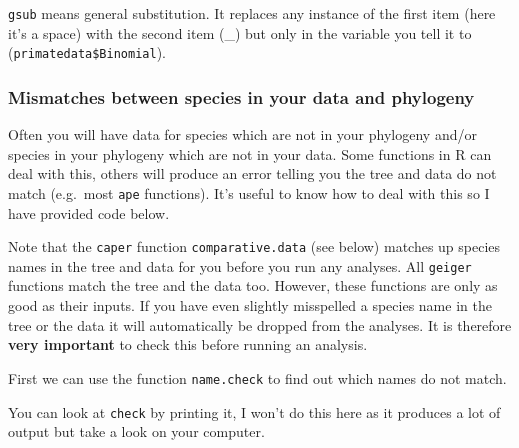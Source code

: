 \documentclass[]{book}
\newenvironment{Shaded}{\begin{snugshade}}{\end{snugshade}}
\newcommand{\KeywordTok}[1]{\textcolor[rgb]{0.13,0.29,0.53}{\textbf{{#1}}}}
\newcommand{\DataTypeTok}[1]{\textcolor[rgb]{0.13,0.29,0.53}{{#1}}}
\newcommand{\StringTok}[1]{\textcolor[rgb]{0.31,0.60,0.02}{{#1}}}
\newcommand{\NormalTok}[1]{{#1}}
\begin{document}
\begin{Shaded}
\end{Shaded}

\texttt{gsub} means general substitution. It replaces any instance of
the first item (here it's a space) with the second item (\_) but only in
the variable you tell it to (\texttt{primatedata\$Binomial}).

\subsubsection{Mismatches between species in your data and
phylogeny}\label{mismatches-between-species-in-your-data-and-phylogeny}

Often you will have data for species which are not in your phylogeny
and/or species in your phylogeny which are not in your data. Some
functions in R can deal with this, others will produce an error telling
you the tree and data do not match (e.g.~most \texttt{ape} functions).
It's useful to know how to deal with this so I have provided code below.

Note that the \texttt{caper} function \texttt{comparative.data} (see
below) matches up species names in the tree and data for you before you
run any analyses. All \texttt{geiger} functions match the tree and the
data too. However, these functions are only as good as their inputs. If
you have even slightly misspelled a species name in the tree or the data
it will automatically be dropped from the analyses. It is therefore
\textbf{very important} to check this before running an analysis.

First we can use the function \texttt{name.check} to find out which
names do not match.

\begin{Shaded}
\end{Shaded}

You can look at \texttt{check} by printing it, I won't do this here as
it produces a lot of output but take a look on your computer.
\end{document}
